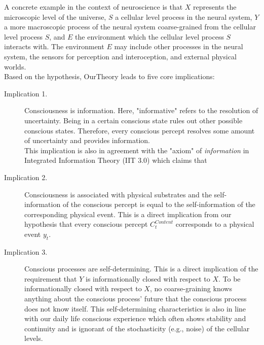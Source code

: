 \documentclass[utf8]{article}
\begin{document}
        A concrete example in the context of neuroscience is that $X$ represents the microscopic level of the universe, $S$ a cellular level process in the neural system, $Y$ a more macroscopic process of the neural system coarse-grained from the cellular level process $S$, and $E$ the environment which the cellular level process $S$ interacts with.  The environment $E$ may include other processes in the neural system, the sensors for perception and interoception, and external physical worlds.\\
        
        Based on the hypothesis, \ac{OurTheory} leads to five core implications: 
        \begin{description}
            \item[Implication 1.] 
            Consciousness is information. Here, "informative" refers to the resolution of uncertainty. Being in a certain conscious state rules out other possible conscious states. Therefore, every conscious percept resolves some amount of uncertainty and provides information. \\ 
            This implication is also in agreement with the "axiom" of \textit{information} in Integrated Information Theory (IIT 3.0) which claims that 
            
            \item[Implication 2.] 
            Consciousness is associated with physical substrates and the self-information of the conscious percept is equal to the self-information of the corresponding physical event. This is a direct implication from our hypothesis that every conscious percept $C_t^{Content}$ corresponds to a physical event $y_t$. 
            
            
            \item[Implication 3.] 
            Conscious processes are self-determining. This is a direct implication of the requirement that $Y$ is informationally closed with respect to $X$. To be informationally closed with respect to $X$, no coarse-graining knows anything about the conscious process' future that the conscious process does not know itself. This self-determining characteristics is also in line with our daily life conscious experience which often shows stability and continuity and is ignorant of the stochasticity (e.g., noise) of the cellular levels.
            


\end{description}
\end{document}
